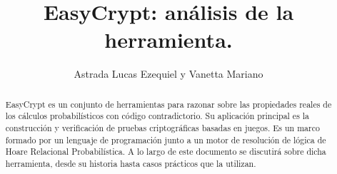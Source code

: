 \documentclass[runningheads,a4paper]{llncs}
\begin{document}
\mainmatter  %

\title{EasyCrypt: análisis de la herramienta.}


%
%
\author
{
Astrada Lucas Ezequiel
y
Vanetta Mariano
}
%


%
%

\maketitle


\begin{abstract}    
EasyCrypt es un conjunto de herramientas para razonar sobre las propiedades reales de los cálculos probabilísticos con código contradictorio. Su aplicación principal es la construcción y verificación de pruebas criptográficas basadas en juegos. 
Es un marco formado por un lenguaje de programación junto a un motor de resolución de lógica de Hoare Relacional Probabilística. A lo largo de este documento se discutirá sobre dicha herramienta, desde su historia hasta casos prácticos que la utilizan.
\cite{article1}


\end{abstract}
\end{document}
